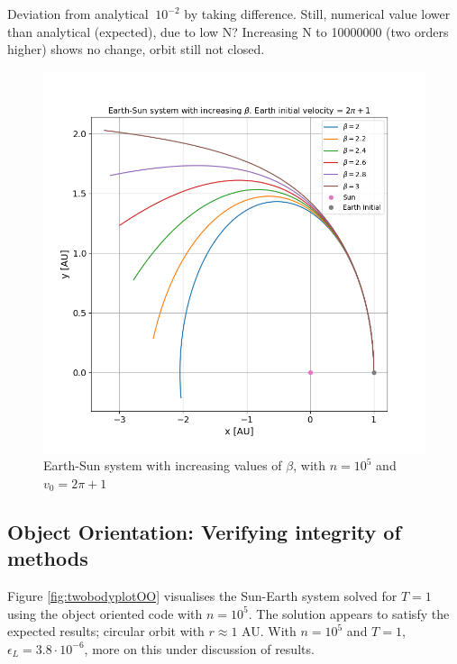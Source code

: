 \documentclass[%
oneside,                 %
final,                   %
10pt]{article}
\begin{document}
Deviation from analytical $~10^{-2}$ by taking difference.
Still, numerical value lower than analytical (expected), due to low N? Increasing N to 10000000 (two orders higher) shows no change,
orbit still not closed.
\begin{figure}[!htb]
        \centering 
         \includegraphics[scale=.5]{../Results/vesc6betas.png} 
        \caption{Earth-Sun system with increasing values of $\beta$, with $n=10^5$ and $v_0=2\pi +1$}
        \label{fig:vesc6betas}   
\end{figure}  

\subsection{Object Orientation: Verifying integrity of methods} 
Figure \ref{fig:twobodyplotOO} visualises the Sun-Earth system solved for $T=1$ using the object oriented code with $n=10^5$. The solution appears to satisfy the expected results; circular orbit with $r\approx 1$ AU. With $n=10^5$ and $T=1$, $\epsilon_L=3.8 \cdot 10^{-6}$, more on this under discussion of results.
\end{document}
